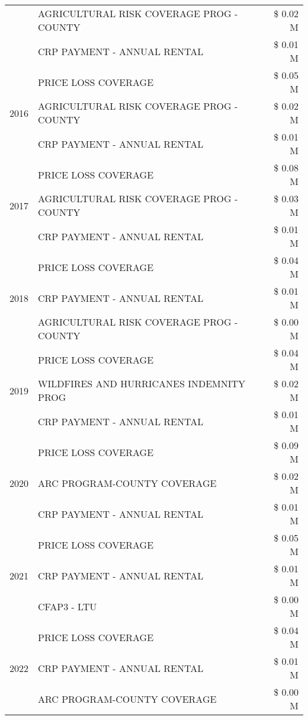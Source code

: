 \begin{tabular}{llr}
 & AGRICULTURAL RISK COVERAGE PROG - COUNTY & \$ 0.02 M \\
 & CRP PAYMENT - ANNUAL RENTAL & \$ 0.01 M \\
\cline{1-3}
\multirow[t]{3}{*}{2016} & PRICE LOSS COVERAGE & \$ 0.05 M \\
 & AGRICULTURAL RISK COVERAGE PROG - COUNTY & \$ 0.02 M \\
 & CRP PAYMENT - ANNUAL RENTAL & \$ 0.01 M \\
\cline{1-3}
\multirow[t]{3}{*}{2017} & PRICE LOSS COVERAGE & \$ 0.08 M \\
 & AGRICULTURAL RISK COVERAGE PROG - COUNTY & \$ 0.03 M \\
 & CRP PAYMENT - ANNUAL RENTAL & \$ 0.01 M \\
\cline{1-3}
\multirow[t]{3}{*}{2018} & PRICE LOSS COVERAGE & \$ 0.04 M \\
 & CRP PAYMENT - ANNUAL RENTAL & \$ 0.01 M \\
 & AGRICULTURAL RISK COVERAGE PROG - COUNTY & \$ 0.00 M \\
\cline{1-3}
\multirow[t]{3}{*}{2019} & PRICE LOSS COVERAGE & \$ 0.04 M \\
 & WILDFIRES AND HURRICANES INDEMNITY PROG & \$ 0.02 M \\
 & CRP PAYMENT - ANNUAL RENTAL & \$ 0.01 M \\
\cline{1-3}
\multirow[t]{3}{*}{2020} & PRICE LOSS COVERAGE & \$ 0.09 M \\
 & ARC PROGRAM-COUNTY COVERAGE & \$ 0.02 M \\
 & CRP PAYMENT - ANNUAL RENTAL & \$ 0.01 M \\
\cline{1-3}
\multirow[t]{3}{*}{2021} & PRICE LOSS COVERAGE & \$ 0.05 M \\
 & CRP PAYMENT - ANNUAL RENTAL & \$ 0.01 M \\
 & CFAP3 - LTU & \$ 0.00 M \\
\cline{1-3}
\multirow[t]{3}{*}{2022} & PRICE LOSS COVERAGE & \$ 0.04 M \\
 & CRP PAYMENT - ANNUAL RENTAL & \$ 0.01 M \\
 & ARC PROGRAM-COUNTY COVERAGE & \$ 0.00 M \\
\cline{1-3}
\bottomrule
\end{tabular}
